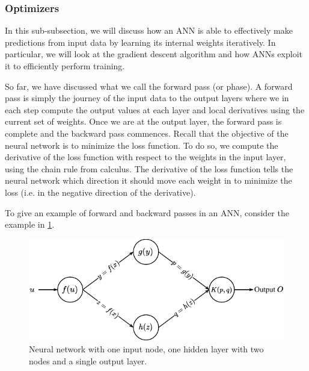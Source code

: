 \subsubsection{Optimizers}
\label{sec:optimizers-ann}
In this sub-subsection, we will discuss how an ANN is able to effectively make predictions from input data by learning its internal weights iteratively. In particular, we will look at the gradient descent algorithm and how ANNs exploit it to efficiently perform training.

So far, we have discussed what we call the forward pass (or phase). A forward pass is simply the journey of the input data to the output layers where we in each step compute the output values at each layer and local derivatives using the current set of weights. Once we are at the output layer, the forward pass is complete and the backward pass commences. Recall that the objective of the neural network is to minimize the loss function. To do so, we compute the derivative of the loss function with respect to the weights in the input layer, using the chain rule from calculus. The derivative of the loss function tells the neural network which direction it should move each weight in to minimize the loss (i.e. in the negative direction of the derivative).

To give an example of forward and backward passes in an ANN, consider the example in \cref{fig:neural-network-example-backprop}.
\begin{figure}[H]
    \centering
    \includegraphics[width=12cm]{thesis/figures/artificial-neural-network-backprop-example_cropped.pdf}
    \caption{Neural network with one input node, one hidden layer with two nodes and a single output layer.}
    \label{fig:neural-network-example-backprop}
\end{figure}

